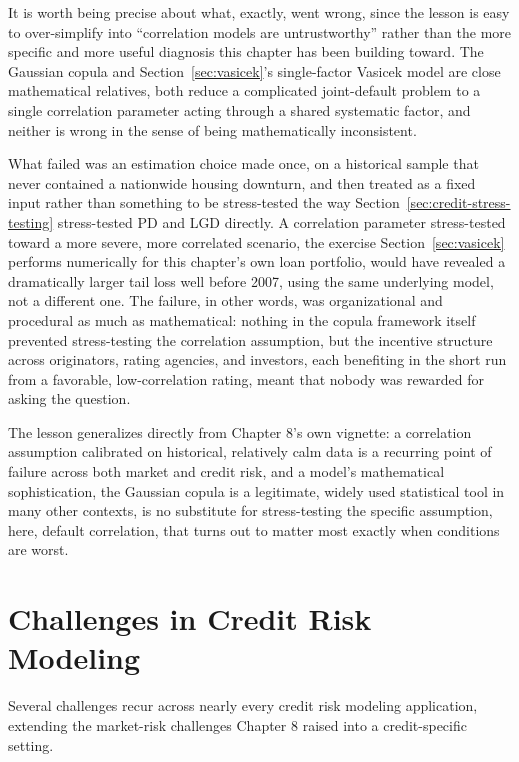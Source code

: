 \documentclass[../ai_in_finance]{subfiles}
\begin{document}
It is worth being precise about what, exactly, went wrong, since the lesson is easy to over-simplify into ``correlation models are untrustworthy'' rather than the more specific and more useful diagnosis this chapter has been building toward. The Gaussian copula and Section~\ref{sec:vasicek}'s single-factor Vasicek model are close mathematical relatives, both reduce a complicated joint-default problem to a single correlation parameter acting through a shared systematic factor, and neither is wrong in the sense of being mathematically inconsistent.

What failed was an estimation choice made once, on a historical sample that never contained a nationwide housing downturn, and then treated as a fixed input rather than something to be stress-tested the way Section~\ref{sec:credit-stress-testing} stress-tested PD and LGD directly. A correlation parameter stress-tested toward a more severe, more correlated scenario, the exercise Section~\ref{sec:vasicek} performs numerically for this chapter's own loan portfolio, would have revealed a dramatically larger tail loss well before 2007, using the same underlying model, not a different one.
The failure, in other words, was organizational and procedural as much as mathematical: nothing in the copula framework itself prevented stress-testing the correlation assumption, but the incentive structure across originators, rating agencies, and investors, each benefiting in the short run from a favorable, low-correlation rating, meant that nobody was rewarded for asking the question.

The lesson generalizes directly from Chapter 8's own vignette: a correlation assumption calibrated on historical, relatively calm data is a recurring point of failure across both market and credit risk, and a model's mathematical sophistication, the Gaussian copula is a legitimate, widely used statistical tool in many other contexts, is no substitute for stress-testing the specific assumption, here, default correlation, that turns out to matter most exactly when conditions are worst.

\section{Challenges in Credit Risk Modeling}

Several challenges recur across nearly every credit risk modeling application, extending the market-risk challenges Chapter 8 raised into a credit-specific setting.
\end{document}
